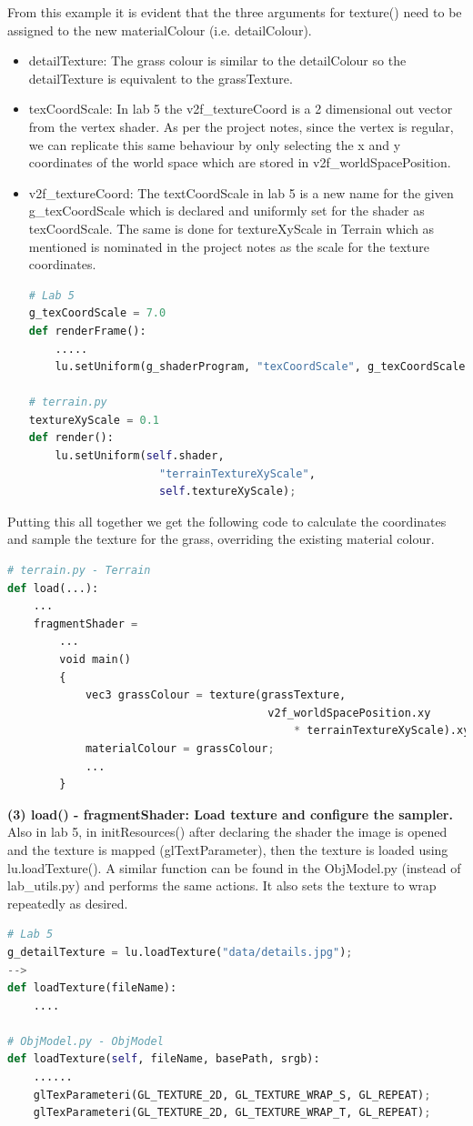 \documentclass[a4 paper, 12pt]{article}
\begin{document}
From this example it is evident that the three arguments for texture() need to be assigned to the new materialColour (i.e. detailColour).
    \begin{itemize}
        \item detailTexture: The grass colour is similar to the detailColour so the detailTexture is equivalent to the grassTexture.
        \item texCoordScale: In lab 5 the v2f\_textureCoord is a 2 dimensional out vector from the vertex shader. As per the project notes, since the vertex is regular, we can replicate this same behaviour by only selecting the x and y coordinates of the world space which are stored in v2f\_worldSpacePosition.
        \item v2f\_textureCoord: The textCoordScale in lab 5 is a new name for the given g\_texCoordScale which is declared and uniformly set for the shader as texCoordScale. The same is done for textureXyScale in Terrain which as mentioned is nominated in the project notes as the scale for the texture coordinates.
    \begin{lstlisting}[language=python] 
# Lab 5 
g_texCoordScale = 7.0
def renderFrame():
    .....
    lu.setUniform(g_shaderProgram, "texCoordScale", g_texCoordScale)

# terrain.py
textureXyScale = 0.1
def render():
    lu.setUniform(self.shader, 
                    "terrainTextureXyScale", 
                    self.textureXyScale);
    \end{lstlisting}
    \end{itemize}

Putting this all together we get the following code to calculate the coordinates and sample the texture for the grass, overriding the existing material colour.
    \begin{lstlisting}[language=python] 
# terrain.py - Terrain
def load(...):
    ...
    fragmentShader =
        ...
        void main()
        {
            vec3 grassColour = texture(grassTexture, 
                                        v2f_worldSpacePosition.xy 
                                            * terrainTextureXyScale).xyz;
            materialColour = grassColour;
            ...
        }
    \end{lstlisting}

\textbf{(3) load() - fragmentShader: Load texture and configure the sampler.} \\
Also in lab 5, in initResources() after declaring the shader the image is opened and the texture is mapped (glTextParameter), then the texture is loaded using lu.loadTexture(). A similar function can be found in the ObjModel.py (instead of lab\_utils.py) and performs the same actions. It also sets the texture to wrap repeatedly as desired.
    \begin{lstlisting}[language=python]   
# Lab 5 
g_detailTexture = lu.loadTexture("data/details.jpg");
--> 
def loadTexture(fileName): 
    ....

# ObjModel.py - ObjModel
def loadTexture(self, fileName, basePath, srgb):
    ......
    glTexParameteri(GL_TEXTURE_2D, GL_TEXTURE_WRAP_S, GL_REPEAT);
    glTexParameteri(GL_TEXTURE_2D, GL_TEXTURE_WRAP_T, GL_REPEAT);
    \end{lstlisting}
\end{document}
